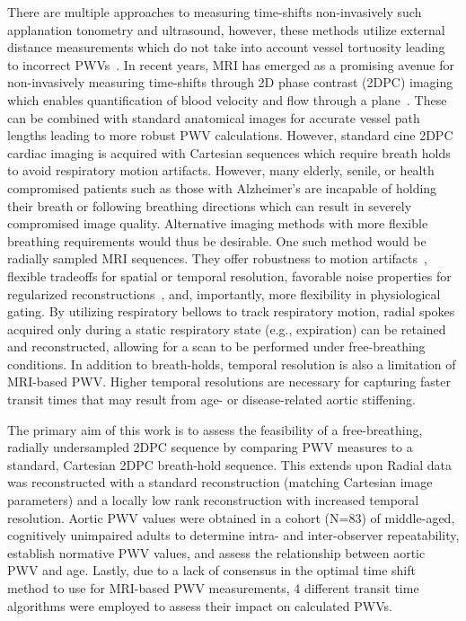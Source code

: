 There are multiple approaches to measuring time-shifts non-invasively such applanation tonometry and ultrasound, however, these methods utilize external distance measurements which do not take into account vessel tortuosity leading to incorrect PWVs~\cite{pereiraNovelMethodsPulse2015}. In recent years, MRI has emerged as a promising avenue for non-invasively measuring time-shifts through 2D phase contrast (2DPC) imaging which enables quantification of blood velocity and flow through a plane~\cite{wentlandReviewMRIbasedMeasurements2014}. These can be combined with standard anatomical images for accurate vessel path lengths leading to more robust PWV calculations. However, standard cine 2DPC cardiac imaging is acquired with Cartesian sequences which require breath holds to avoid respiratory motion artifacts. However, many elderly, senile, or health compromised patients such as those with Alzheimer's are incapable of holding their breath or following breathing directions which can result in severely compromised image quality. Alternative imaging methods with more flexible breathing requirements would thus be desirable. One such method would be radially sampled MRI sequences. They offer robustness to motion artifacts~\cite{gloverProjectionReconstructionTechniques1992}, flexible tradeoffs for spatial or temporal resolution, favorable noise properties for regularized reconstructions~\cite{lustigSparseMRIApplication2007}, and, importantly, more flexibility in physiological gating. By utilizing respiratory bellows to track respiratory motion, radial spokes acquired only during a static respiratory state (e.g., expiration) can be retained and reconstructed, allowing for a scan to be performed under free-breathing conditions. In addition to breath-holds, temporal resolution is also a limitation of MRI-based PWV\@. Higher temporal resolutions are necessary for capturing faster transit times that may result from age- or disease-related aortic stiffening. 

The primary aim of this work is to assess the feasibility of a free-breathing, radially undersampled 2DPC sequence by comparing PWV measures to a standard, Cartesian 2DPC breath-hold sequence. This extends upon Radial data was reconstructed with a standard reconstruction (matching Cartesian image parameters) and a locally low rank reconstruction with increased temporal resolution. Aortic PWV values were obtained in a cohort (N=83) of middle-aged, cognitively unimpaired adults to determine intra- and inter-observer repeatability, establish normative PWV values, and assess the relationship between aortic PWV and age. Lastly, due to a lack of consensus in the optimal time shift method to use for MRI-based PWV measurements, 4 different transit time algorithms were employed to assess their impact on calculated PWVs.

